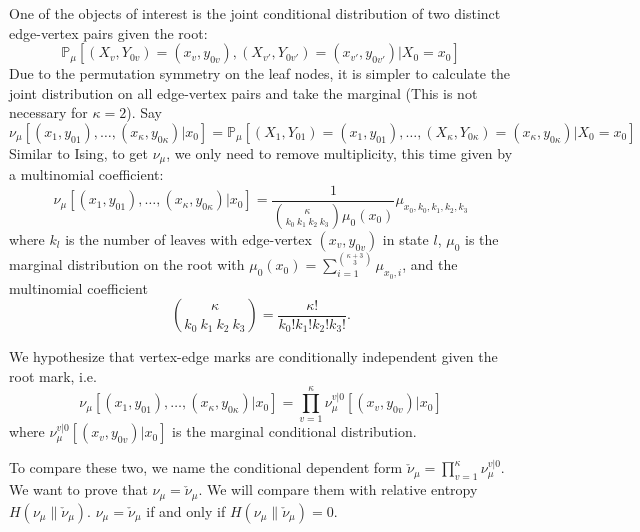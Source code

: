 \documentclass[12pt]{article}
\numberwithin{equation}{section}
\begin{document}
One of the objects of interest is the joint conditional distribution of two distinct edge-vertex pairs given the root:
\begin{equation*}
    \mathbb{P}_\mu\left[(X_v, Y_{0v}) = (x_v, y_{0v}), (X_{v'}, Y_{0v'}) = (x_{v'}, y_{0v'}) | X_0 = x_0\right]
\end{equation*}
Due to the permutation symmetry on the leaf nodes, it is simpler to calculate the joint distribution on all edge-vertex
pairs and take the marginal (This is not necessary for $\kappa=2$). Say
\begin{equation*}
    \nu_\mu[(x_1, y_{01}), \ldots, (x_\kappa, y_{0\kappa})| x_0] = \mathbb{P}_\mu\left[(X_1, Y_{01}) = (x_1, y_{01}), \ldots,  (X_{\kappa}, Y_{0\kappa}) = (x_{\kappa}, y_{0\kappa}) | X_0 = x_0\right]
\end{equation*}
Similar to Ising, to get $\nu_\mu$, we only need to remove multiplicity, this time given by a multinomial coefficient:
\begin{equation*}
    \nu_\mu[(x_1, y_{01}), \ldots, (x_\kappa, y_{0\kappa})| x_0] = \frac{1}{{\kappa \choose {k_0\ k_1\ k_2\ k_3}}\mu_0(x_0)}\mu_{x_0, k_0, k_1, k_2, k_3}
\end{equation*}
where $k_l$ is the number of leaves with edge-vertex $(x_v, y_{0v})$ in state $l$, $\mu_0$ is the marginal distribution on the root with $\mu_0(x_0) = \sum_{i=1}^{{\kappa+3\choose 3}} \mu_{x_0, i}$, and the multinomial coefficient
\begin{equation*}
    {\kappa \choose {k_0\ k_1\ k_2\ k_3}} = \frac{\kappa!}{k_0!k_1!k_2!k_3!}.
\end{equation*}

We hypothesize that vertex-edge marks are conditionally independent given the root mark, i.e.
\begin{equation*}
    \nu_\mu[(x_1, y_{01}), \ldots, (x_\kappa, y_{0\kappa})| x_0] = \prod_{v=1}^\kappa \nu_\mu^{v|0} [(x_v, y_{0v}) | x_0]
\end{equation*}
where $\nu_\mu^{v|0} [(x_v, y_{0v}) | x_0]$ is the marginal conditional distribution.

To compare these two, we name the conditional dependent form $\check{\nu}_\mu = \prod_{v=1}^\kappa \nu_\mu^{v|0}$. We want to prove that $\nu_\mu = \check{\nu}_\mu$. We will compare them with relative entropy $H(\nu_\mu \| \check{\nu}_\mu)$. $\nu_\mu = \check{\nu}_\mu$ if and only if $H(\nu_\mu \| \check{\nu}_\mu) = 0$.

\newpage
\end{document}
